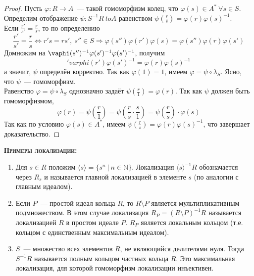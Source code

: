 \documentclass[11pt]{article}
\begin{document}
\begin{proof}
        Пусть $\varphi\colon R \to A$~--- такой гомоморфизм колец, что $\varphi(s) \in A^* \ \forall s \in S$.
        Определим отображение $\psi\colon S^{-1}R \ to A$ равенством $\psi(\frac{r}{s}) = \varphi(r) \varphi(s)^{-1}$. \\

        Если $\frac{r'}{s'} = \frac{r}{s}$, то по определению
        \[ \frac{r'}{s'} = \frac{r}{s} \Leftrightarrow r' s = r s', \ s'' \in S \Rightarrow \varphi(s'')\varphi(r')\varphi(s) = \varphi(s'') \varphi(r) \varphi(s') \]
        Домножим на $\vaphi(s'')^{-1} \varphi(s')^{-1} \varphi(s')^{-1}$, получим
        \[ 'varphi(r') \varphi(s')^{-1} = \varphi(r) \varphi(s)^{-1} \]
        а значит, $\psi$ определён корректно. Так как $\varphi(1) = 1$, имеем $\varphi = \psi \circ \lambda_{S}$. Ясно, что $\psi$~--- гомоморфизм. \\

        Равенство $\varphi = \psi \circ \lambda_{S}$ однозначно задаёт $\psi(\frac{r}{1}) = \varphi(r)$. Так как $\psi$ должен
        быть гомоморфизмом,
        \[ \varphi(r) = \psi(\frac{r}{1}) = \psi(\frac{r}{s} \cdot \frac{s}{1}) = \psi(\frac{r}{s}) \cdot \varphi(s) \]
        Так как по условию $\varphi(s) \in A^*$, имеем $\psi(\frac{r}{s}) = \varphi(r)\varphi(s)^{-1}$, что завершает доказательство.


    \end{proof}

    \textsc{\textbf{Примеры локализации:}}
    \begin{enumerate}
        \item Для $s \in R$ положим $\langle s \rangle = \{ s^n \ | \ n \in \mathbb{N} \}$. Локализация $\langle s \rangle^{-1}R$
              обозначается через $R_s$ и называется главной локализацией в элементе $s$ (по аналогии с главным идеалом).
        \item Если $P$~--- простой идеал кольца $R$, то $R \setminus P$ является мультипликативным подмножеством.
              В этом случае локализация $R_{P} = (R \setminus P)^{-1} R$ называется локализацией $R$ в простом идеале $P$.
              $R_P$ является локальным кольцом (т.е. кольцом с единственным максимальным идеалом).
        \item $S$~--- множество всех элементов $R$, не являющийся делителями нуля. Тогда $S^{-1}R$ называется полным кольцом частных
              кольца $R$. Это максимальная локализация, для которой гомоморфизм локализации инъективен.
    \end{enumerate}
\end{document}
